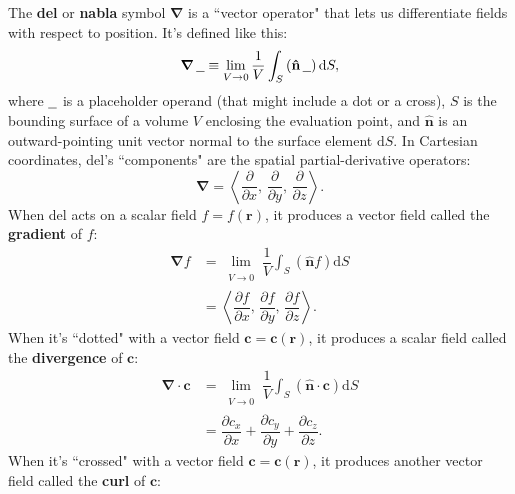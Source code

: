 \documentclass[12pt]{article}
\renewcommand{\vv}[1]{\mathbf{#1}}
\newcommand{\dd}[1]{\mathrm{d}#1}
\newcommand{\del}{\boldsymbol{\nabla}}
\begin{document}
The \textbf{del} or \textbf{nabla} symbol $\del$ is a ``vector operator" that lets us differentiate fields with respect to position. It's defined like this:
\begin{equation*}
\del \, \text{\underline{\hspace{.6em}}} \equiv \lim\limits_{\substack{\\ V \to 0}} \dfrac{1}{V} \int_S \left(\vv{\hat{n}} \, \text{\underline{\hspace{.6em}}} \right) \dd S ,
\end{equation*}
where $\text{\underline{\hspace{.6em}}}$ is a placeholder operand (that might include a dot or a cross), $S$ is the bounding surface of a volume $V$ enclosing the evaluation point, and $\vv{\hat{n}}$ is an outward-pointing unit vector normal to the surface element $\dd S$. In Cartesian coordinates, del's ``components" are the spatial partial-derivative operators:
\begin{equation*}
\del = \left \langle \dfrac{\partial}{\partial x}, \, \dfrac{\partial}{\partial y}, \, \dfrac{\partial}{\partial z} \right \rangle .
\end{equation*}
When del acts on a scalar field $f = f(\vv r)$, it produces a vector field called the \textbf{gradient} of $f$:
\begin{equation*}
\begin{aligned}
\del f &= \lim\limits_{\substack{\\ V \to 0}} \dfrac{1}{V} \int_S \left( \vv{\hat{n}} f \right) \dd S  \\[4pt]
&= \left \langle \dfrac{\partial f}{\partial x}, \, \dfrac{\partial f}{\partial y}, \, \dfrac{\partial f}{\partial z} \right \rangle .
\end{aligned}
\end{equation*}
When it's ``dotted" with a vector field $\vv c = \vv c (\vv r)$, it produces a scalar field called the \textbf{divergence} of $\vv c$:
\begin{equation*}
\begin{aligned}
\del \cdot \vv c &= \lim\limits_{\substack{\\ V \to 0}} \dfrac{1}{V} \int_S \left(\vv{\hat{n}}  \cdot \vv c \right) \dd S \\[4pt]
&= \dfrac{\partial c_x}{\partial x} + \dfrac{\partial c_y}{\partial y} + \dfrac{\partial c_z}{\partial z} .
\end{aligned}
\end{equation*}
When it's ``crossed" with a vector field $\vv c = \vv c (\vv r)$, it produces another vector field called the \textbf{curl} of $\vv c$:
\end{document}
